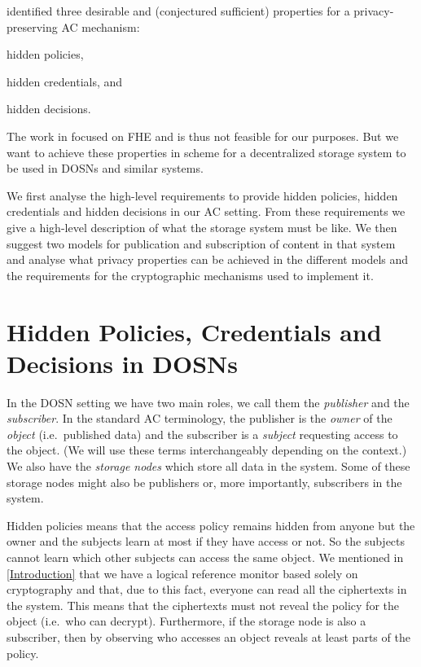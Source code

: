 \citet{TowardsPPACwHPHCHD} identified three desirable and (conjectured 
sufficient) properties for a privacy-preserving \ac{AC} mechanism:
\begin{inparablank}
\item hidden policies,
\item hidden credentials, and
\item hidden decisions.
\end{inparablank}
The work in \cite{TowardsPPACwHPHCHD} focused on \ac{FHE} and is thus not 
feasible for our purposes.
But we want to achieve these properties in  scheme for a decentralized 
storage system to be used in \acp{DOSN} and similar systems.

We first analyse the high-level requirements to provide hidden policies, hidden 
credentials and hidden decisions in our \ac{AC} setting.
From these requirements we give a high-level description of what the storage 
system must be like.
We then suggest two models for publication and subscription of content in that 
system and analyse what privacy properties can be achieved in the different 
models and the requirements for the cryptographic mechanisms used to implement 
it.


\section{Hidden Policies, Credentials and Decisions in 
  \acsp{DOSN}}\label{HiddenPCD}

In the \ac{DOSN} setting we have two main roles, we call them the 
\emph{publisher} and the \emph{subscriber}.
In the standard \ac{AC} terminology, the publisher is the \emph{owner} of the 
\emph{object} (i.e.\ published data) and the subscriber is a \emph{subject} 
requesting access to the object.
(We will use these terms interchangeably depending on the context.)
We also have the \emph{storage nodes} which store all data in the system.
Some of these storage nodes might also be publishers or, more importantly, 
subscribers in the system.

Hidden policies means that the access policy remains hidden from anyone but the 
owner and the subjects learn at most if they have access or not.
So the subjects cannot learn which other subjects can access the same object.
We mentioned in \cref{Introduction} that we have a logical reference monitor 
based solely on cryptography and that, due to this fact, everyone can read all 
the ciphertexts in the system.
This means that the ciphertexts must not reveal the policy for the object 
(i.e.\ who can decrypt).
Furthermore, if the storage node is also a subscriber, then by observing who 
accesses an object reveals at least parts of the policy.

